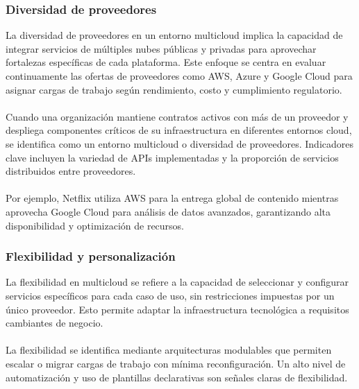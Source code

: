 {            \subsubsection{Diversidad de proveedores}
                La diversidad de proveedores en un entorno multicloud implica la capacidad de integrar servicios de múltiples nubes públicas y privadas para aprovechar fortalezas específicas de cada plataforma. Este enfoque se centra en evaluar continuamente las ofertas de proveedores como AWS, Azure y Google Cloud para asignar cargas de trabajo según rendimiento, costo y cumplimiento regulatorio.
                
                \paragraph{}Cuando una organización mantiene contratos activos con más de un proveedor y despliega componentes críticos de su infraestructura en diferentes entornos cloud, se identifica como un entorno multicloud o diversidad de proveedores. Indicadores clave incluyen la variedad de APIs implementadas y la proporción de servicios distribuidos entre proveedores.
                
                \paragraph{}Por ejemplo, Netflix utiliza AWS para la entrega global de contenido mientras aprovecha Google Cloud para análisis de datos avanzados, garantizando alta disponibilidad y optimización de recursos.
            
            \subsubsection{Flexibilidad y personalización}
                La flexibilidad en multicloud se refiere a la capacidad de seleccionar y configurar servicios específicos para cada caso de uso, sin restricciones impuestas por un único proveedor. Esto permite adaptar la infraestructura tecnológica a requisitos cambiantes de negocio.
            
                \paragraph{}La flexibilidad se identifica mediante arquitecturas modulables que permiten escalar o migrar cargas de trabajo con mínima reconfiguración. Un alto nivel de automatización y uso de plantillas declarativas son señales claras de flexibilidad.
                
}
